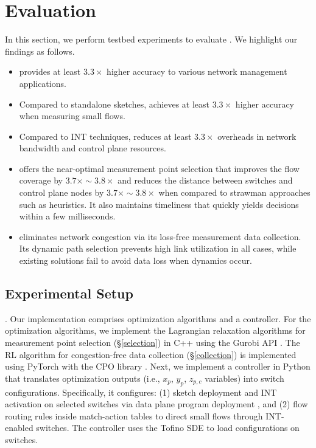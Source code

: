 \section{Evaluation}

In this section, we perform testbed experiments to evaluate \sysname. We highlight our findings as follows.

\begin{itemize}[leftmargin=*]
%
    \item \sysname provides at least $3.3\times$ higher accuracy to various network management applications. 
%
    \item Compared to standalone sketches, \sysname achieves at least $3.3\times$ higher accuracy when measuring small flows.
%
    \item Compared to INT techniques, \sysname reduces at least $3.3\times$ overheads in network bandwidth and control plane resources. 
%
    \item \sysname offers the near-optimal measurement point selection that improves the flow coverage by $3.7\times \sim 3.8\times$ and reduces the distance between switches and control plane nodes by $3.7\times \sim 3.8\times$ when compared to strawman approaches such as heuristics. It also maintains timeliness that quickly yields decisions within a few milliseconds. 
%
    \item \sysname eliminates network congestion via its loss-free measurement data collection. Its dynamic path selection prevents high link utilization in all cases, while existing solutions fail to avoid data loss when dynamics occur. 
%
\end{itemize}

\subsection{Experimental Setup}

. Our implementation comprises optimization algorithms and a controller. For the optimization algorithms, we implement the Lagrangian relaxation algorithms for measurement point selection (\S\ref{selection}) in C++ using the Gurobi API \cite{gurobi}. The RL algorithm for congestion-free data collection (\S\ref{collection}) is implemented using PyTorch with the CPO library \cite{pytorch}. Next, we implement a controller in Python that translates optimization outputs (i.e., \(x_p\), \(y_p\), \(z_{p,c}\) variables) into switch configurations. Specifically, it configures: (1) sketch deployment and INT activation on selected switches via data plane program deployment \cite{chen2020speed,gao2020lyra}, and (2) flow routing rules inside match-action tables to direct small flows through INT-enabled switches. The controller uses the Tofino SDE \cite{tofino2} to load configurations on switches.

